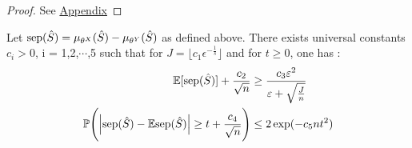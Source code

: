 \begin{proof}
    See \hyperref[appendix]{Appendix}
\end{proof}
\begin{lemma}\label{lemma13gerber}
    Let $\text{sep}(\hat{S}) = \mu_{\theta^X}(\hat{S})- \mu_{\theta^Y}(\hat{S})$ as defined above. There exists universal constants $c_i >0$, i = 1,2,$\cdots$,5 such that for $J = \big\lfloor c_1\epsilon^{-\frac{1}{s}}\big\rfloor$ and for $t \geq 0$, one has : 
    \begin{align}
        \mathbb{E}[\text{sep}(\hat{S})] + \frac{c_2}{\sqrt{n}} &\geq \frac{c_3 \varepsilon^2}{\varepsilon + \sqrt{\frac{J}{n}}} \\
        \mathbb{P}\Biggl(\Big|\text{sep}(\hat{S})-\mathbb{E} \text{sep}(\hat{S}) \Big| \geq t+ \frac{c_4}{\sqrt{n}}\Biggr) &\leq 2 \exp(-c_5nt^2)
    \end{align}
\end{lemma}
